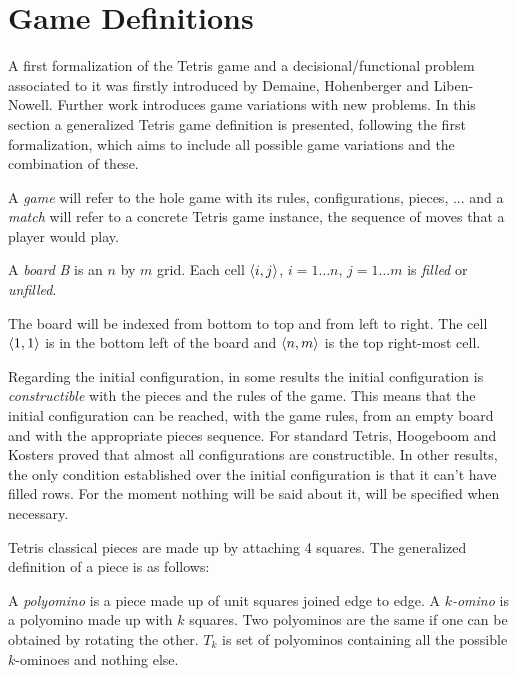 \section{Game Definitions}

A first formalization of the Tetris game and a decisional/functional problem associated to it was firstly introduced by Demaine, Hohenberger and Liben-Nowell\cite{TIH}. Further work\cite{TT,TWFP,TCB,CTV,CTV} introduces game variations with new problems. In this section a generalized Tetris game definition is presented, following the first formalization, which aims to include all possible game variations and the combination of these. 

A \emph{game} will refer to the hole game with its rules, configurations, pieces, ... and a \emph{match} will refer to a concrete Tetris game instance, the sequence of moves that a player would play.

\begin{definition} 
  A \emph{board} \emph{B} is an $n$ by $m$ grid. Each cell $\cell$, $i = 1\dots n$, $j = 1\dots m$ is \emph{filled} or \emph{unfilled}.
\end{definition}

The board will be indexed from bottom to top and from left to right. The cell $\cell[1][1]$ is in the bottom left of the board and $\cell[n][m]$ is the top right-most cell. 

Regarding the initial configuration, in some results\cite{TT, } the initial configuration is \emph{constructible} with the pieces and the rules of the game. This means that the initial configuration can be reached, with the game rules, from an empty board and with the appropriate pieces sequence. For standard Tetris, Hoogeboom and Kosters proved that almost all configurations are constructible\cite{HCTC}. In other results\cite{TIH, TWFP, TWCB}, the only condition established over the initial configuration is that it can't have filled rows. For the moment nothing will be said about it, will be specified when necessary.
\vspace{10px}

Tetris classical pieces are made up by attaching 4 squares. The generalized definition\cite{TT, WikiFandom} of a piece is as follows:

\begin{definition}  
  A \emph{polyomino} is a piece made up of unit squares joined edge to edge. A \emph{$k$-omino} is a polyomino made up with $k$ squares. Two polyominos are the same if one can be obtained by rotating the other. $T_k$ is set of polyominos containing all the possible $k$-ominoes and nothing else.
\end{definition}

